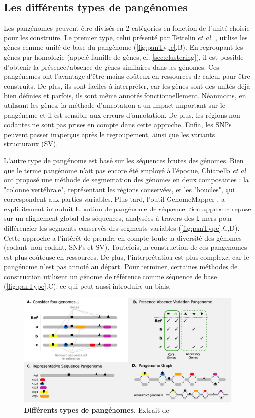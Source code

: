 \newpage

\subsection{Les différents types de pangénomes}

Les pangénomes peuvent être divisés en 2 catégories en fonction de l'unité choisie pour les construire. Le premier type, celui présenté par Tettelin \textit{et al.} \cite{tettelin_genome_2005}, utilise les gènes comme unité de base du pangénome (\autoref{fig:panType}.B). En regroupant les gènes par homologie (appelé famille de gènes, cf. \autoref{sec:clustering}), il est possible d'obtenir la présence/absence de gènes similaires dans les génomes. Ces pangénomes ont l'avantage d'être moins coûteux en ressources de calcul pour être construits. De plus, ils sont faciles à interpréter, car les gènes sont des unités déjà bien définies et parfois, ils sont même annotés fonctionnellement. Néanmoins, en utilisant les gènes, la méthode d'annotation a un impact important sur le pangénome et il est sensible aux erreurs d'annotation. De plus, les régions non codantes ne sont pas prises en compte dans cette approche. Enfin, les SNPs peuvent passer inaperçus après le regroupement, ainsi que les variants structuraux (SV).

L'autre type de pangénome est basé sur les séquences brutes des génomes. Bien que le terme pangénome n’ait pas encore été employé à l’époque, Chiapello \textit{et al.} \cite{chiapello_systematic_2005} ont proposé une méthode de segmentation des génomes en deux composantes : la "colonne vertébrale", représentant les régions conservées, et les "boucles", qui correspondent aux parties variables. Plus tard, l’outil GenomeMapper \cite{schneeberger_simultaneous_2009}, a explicitement introduit la notion de pangénome de séquence. Son approche repose sur un alignement global des séquences, analysées à travers des k-mers pour différencier les segments conservés des segments variables (\autoref{fig:panType}.C,D). Cette approche a l'intérêt de prendre en compte toute la diversité des génomes (codant, non codant, SNPs et SV). Toutefois, la construction de ces pangénomes est plus coûteuse en ressources. De plus, l'interprétation est plus complexe, car le pangénome n'est pas annoté au départ. Pour terminer, certaines méthodes de construction utilisent un génome de référence comme séquence de base (\autoref{fig:panType}.C), ce qui peut aussi introduire un biais.

\begin{figure}[htbp]
    \centering
    \includegraphics[width=0.8\linewidth]{images/pangenomeTypes.jpeg}
    \caption[Différents types de pangénomes]{\textbf{Différents types de pangénomes.} Extrait de \cite{matthews_gentle_2024}}
    \label{fig:panType}
\end{figure}
